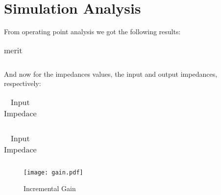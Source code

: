 \section{Simulation Analysis}
\label{sec:simulation} 



From operating point analysis we got the following results:
\FloatBarrier
\begin{table}[h]
  \centering
  \begin{tabular}{|c|c|c|c|c|}
    \hline    
    
    \hline
  \end{tabular}
  \caption{merit}
  \label{tab:Spice1}
\end{table}
\FloatBarrier  

And now for the impedances values, the input and output impedances, respectively:

\FloatBarrier
\begin{table}[h]
  \centering
  \begin{tabular}{|c|c|}
    \hline    
    
    \hline
  \end{tabular}
  \caption{Input Impedace}
  \label{tab:Spice1}
\end{table}
\FloatBarrier 
  
\FloatBarrier
\begin{table}[h]
  \centering
  \begin{tabular}{|c|c|}
    \hline    
    
    \hline
  \end{tabular}
  \caption{Input Impedace}
  \label{tab:Spice1}
\end{table}
\FloatBarrier  


\begin{figure} [!htb] 
  \texttt{[image: gain.pdf]}
  \caption{Incremental Gain}
  \label{fig:theoplots}
  \endminipage\hfill
\end{figure}



